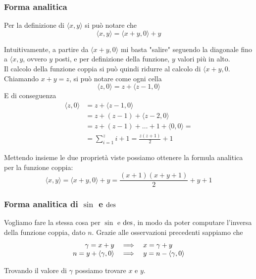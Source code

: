 \subsubsection{Forma analitica} 
Per la definizione di $\langle x,y \rangle$ si può notare che
$$ \langle x,y \rangle = \langle x + y,0 \rangle + y $$

\begin{center}
	
\end{center}

Intuitivamente, a partire da $\langle x + y, 0\rangle$ mi basta "salire" seguendo la diagonale fino a $\langle x,y$, ovvero $y$ posti, e per definizione della funzione, $y$ valori più in alto.\\

Il calcolo della funzione coppia si può quindi ridurre al calcolo di $\langle x + y, 0$. Chiamando $x + y = z$, si può notare come ogni cella 
$$ \langle z,0 \rangle = z + \langle z - 1, 0 \rangle $$
E di conseguenza
\begin{align*}
	\langle z,0 \rangle & = z + \langle z - 1, 0 \rangle \\
	& = z + (z-1) + \langle z-2, 0 \rangle \\
	& = z + (z-1) + \dots + 1 + \langle 0,0 \rangle = \\
	& = \sum_{i=1}^{z} i + 1 = \frac{z(z+1)}{2} + 1
\end{align*}

Mettendo insieme le due proprietà viste possiamo ottenere la formula analitica per la funzione coppia: 
$$ \langle x,y \rangle = \langle x + y, 0 \rangle + y = \frac{(x + 1) (x + y + 1)}{2} + y + 1 $$

\subsubsection{Forma analitica di $\sin$ e $\operatorname{des}$} 
Vogliamo fare la stessa cosa per $\sin$ e $\operatorname{des}$, in modo da poter computare l'inversa della funzione coppia, dato $n$. Grazie alle osservazioni precedenti sappiamo che
$$ \begin{array}{r c l}
	\gamma = x + y & \implies & x = \gamma + y \\
	n = y + \langle \gamma , 0 \rangle & \implies & y = n - \langle \gamma , 0 \rangle \\
\end{array} $$

Trovando il valore di $\gamma$ possiamo trovare $x$ e $y$. \\

